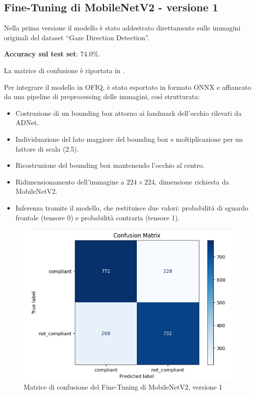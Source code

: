 \documentclass[12pt,a4paper,openright,twoside]{book}
\begin{document}
\subsection{Fine-Tuning di MobileNetV2 - versione 1}
\label{chap:mobilenetv2_ft_v1}

Nella prima versione il modello è stato addestrato direttamente sulle immagini originali del dataset ``Gaze Direction Detection''.  

\textbf{Accuracy sul test set}: 74.0\%.  

La matrice di confusione è riportata in .  

Per integrare il modello in OFIQ,  è stato esportato in formato ONNX e affiancato da una pipeline di preprocessing delle immagini, così strutturata:
\begin{itemize}
    \item Costruzione di un bounding box attorno ai landmark dell'occhio rilevati da ADNet.
    \item Individuazione del lato maggiore del bounding box e moltiplicazione per un fattore di scala (2.5).
    \item Ricostruzione del bounding box mantenendo l'occhio al centro.
    \item Ridimensionamento dell'immagine a \(224 \times 224\), dimensione richiesta da MobileNetV2.
    \item Inferenza tramite il modello, che restituisce due valori: probabilità di sguardo frontale (tensore 0) e probabilità contraria (tensore 1).
\end{itemize}

\begin{figure}
    \centering
    \includegraphics[width=.6\linewidth]{figures/fine-tuning-mobilenetv2-version-1-confusion-matrix.png}
    \caption{Matrice di confusione del Fine-Tuning di MobileNetV2, versione 1}
    \label{fig:fine_tuning_mobilenetv2_version_1_confusion_matrix}
\end{figure}
\end{document}
